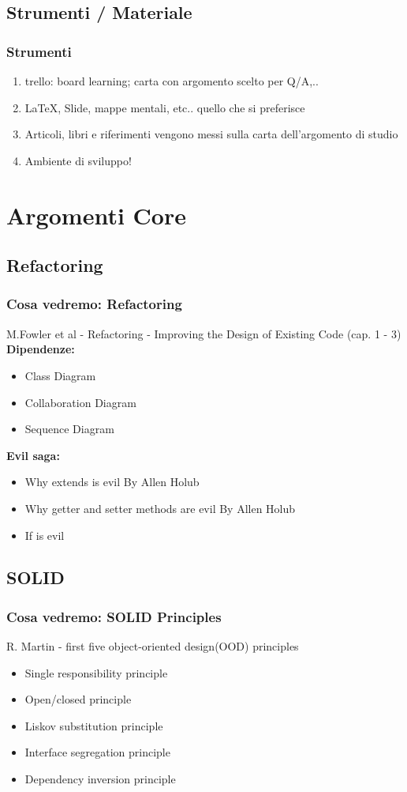 \documentclass{beamer}
\begin{document}
\subsection{Strumenti / Materiale}
\begin{frame}
	\frametitle{Strumenti}
	\begin{enumerate}
  			\item<+-> trello: board learning; carta con argomento scelto per Q/A,..
  			\item<+-> \LaTeX, Slide, mappe mentali, etc.. quello che si preferisce
  			\item<+-> Articoli, libri e riferimenti vengono messi sulla carta dell'argomento di studio
  			\item<+-> Ambiente di sviluppo!
	\end{enumerate}
\end{frame}

\section{Argomenti Core}
\subsection{Refactoring}
\begin{frame}
	\frametitle{Cosa vedremo: Refactoring}
	M.Fowler et al - Refactoring - Improving the Design of Existing Code (cap. 1 - 3) \\
	\textbf{Dipendenze:}
	\begin{itemize}
  			\item Class Diagram
  			\item Collaboration Diagram
  			\item Sequence Diagram
	\end{itemize}
	\textbf{Evil saga:}
	\begin{itemize}
  			\item Why extends is evil By Allen Holub
  			\item Why getter and setter methods are evil By Allen Holub
  			\item If is evil
	\end{itemize}
\end{frame}

\subsection{SOLID}
\begin{frame}
	\frametitle{Cosa vedremo: SOLID Principles}
	R. Martin - first five object-oriented design(OOD) principles \\
	\begin{itemize}
  			\item Single responsibility principle
  			\item Open/closed principle
  			\item Liskov substitution principle
  			\item Interface segregation principle
  			\item Dependency inversion principle
	\end{itemize}
\end{frame}
\end{document}
